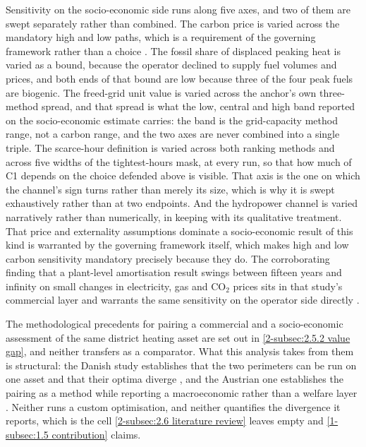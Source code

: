 Sensitivity on the socio-economic side runs along five axes, and two of them are swept separately rather than combined. The carbon price is varied across the mandatory high and low paths, which is a requirement of the governing framework rather than a choice \cite{finansdepartement_prinsipper_2021}. The fossil share of displaced peaking heat is varied as a bound, because the operator declined to supply fuel volumes and prices, and both ends of that bound are low because three of the four peak fuels are biogenic. The freed-grid unit value is varied across the anchor's own three-method spread, and that spread is what the low, central and high band reported on the socio-economic estimate carries: the band is the grid-capacity method range, not a carbon range, and the two axes are never combined into a single triple. The scarce-hour definition is varied across both ranking methods and across five widths of the tightest-hours mask, at every run, so that how much of C1 depends on the choice defended above is visible. That axis is the one on which the channel's sign turns rather than merely its size, which is why it is swept exhaustively rather than at two endpoints. And the hydropower channel is varied narratively rather than numerically, in keeping with its qualitative treatment. That price and externality assumptions dominate a socio-economic result of this kind is warranted by the governing framework itself, which makes high and low carbon sensitivity mandatory precisely because they do. The corroborating finding that a plant-level amortisation result swings between fifteen years and infinity on small changes in electricity, gas and CO$_2$ prices sits in that study's commercial layer and warrants the same sensitivity on the operator side directly \cite{moser_socioeconomic_2018}.

The methodological precedents for pairing a commercial and a socio-economic assessment of the same district heating asset are set out in \autoref{2-subsec:2.5.2 value gap}, and neither transfers as a comparator. What this analysis takes from them is structural: the Danish study establishes that the two perimeters can be run on one asset and that their optima diverge \cite{ostergaard_business_2019}, and the Austrian one establishes the pairing as a method while reporting a macroeconomic rather than a welfare layer \cite{moser_socioeconomic_2018}. Neither runs a custom optimisation, and neither quantifies the divergence it reports, which is the cell \autoref{2-subsec:2.6 literature review} leaves empty and \autoref{1-subsec:1.5 contribution} claims.

